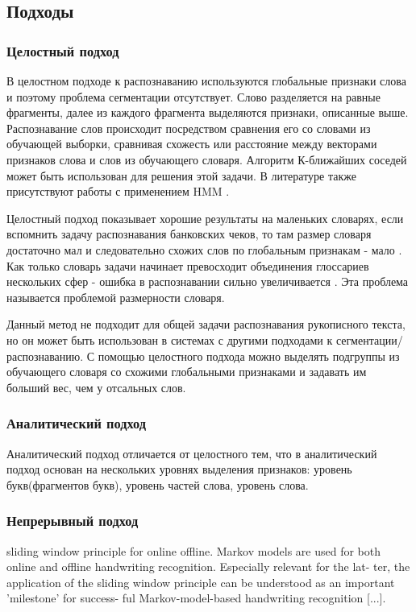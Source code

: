 \subsection{Подходы}
\subsubsection{Целостный подход}
В целостном подходе к распознаванию используются глобальные признаки слова и поэтому проблема сегментации отсутствует. Слово разделяется на равные фрагменты, далее из каждого фрагмента выделяются признаки, описанные выше. Распознавание слов происходит посредством сравнения его со словами из обучающей выборки, сравнивая схожесть или расстояние между векторами признаков слова и слов из обучающего словаря. Алгоритм К-ближайших соседей может быть использован для решения этой задачи. В литературе также присутствуют работы с применением HMM \cite{lavrenko2004holistic}.

Целостный подход показывает хорошие результаты на маленьких словарях, если вспомнить задачу распознавания банковских чеков, то там размер словаря достаточно мал и следовательно схожих слов по глобальным признакам - мало \cite{guillevic1995unconstrained} . Как только словарь задачи начинает превосходит объединения глоссариев нескольких сфер - ошибка в распознавании сильно увеличивается \cite{rehman2012off}. Эта проблема называется проблемой размерности словаря.

Данный метод не подходит для общей задачи распознавания рукописного текста, но он может быть использован в системах с другими подходами к сегментации/распознаванию. С помощью целостного подхода можно выделять подгруппы из обучающего словаря со схожими глобальными признаками и задавать им больший вес, чем у отсальных слов.

\subsubsection{Аналитический подход}

Аналитический подход отличается от целостного тем, что в аналитический подход основан на нескольких уровнях выделения признаков: уровень букв(фрагментов букв), уровень частей слова, уровень слова.

\subsubsection{Непрерывный подход}

sliding window principle for online offline. Markov models are used for both online and offline handwriting recognition. Especially relevant for the lat- ter, the application of the sliding window principle can be understood as an important ’milestone’ for success- ful Markov-model-based handwriting recognition [...].\cite{plotz2009markov}

